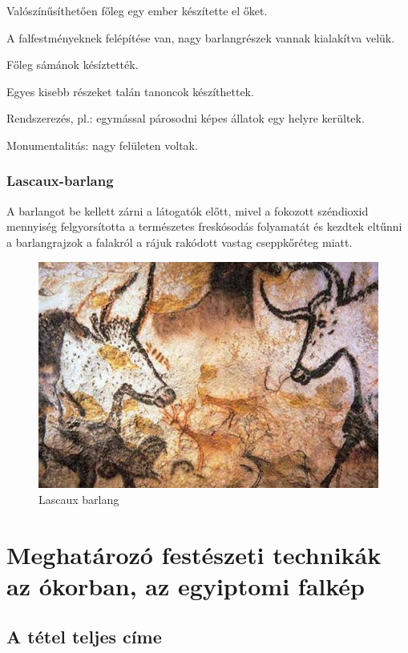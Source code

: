 		\begin{compactitem}
			\item Valószínűsíthetően főleg egy ember készítette el őket. 
			\item A falfestményeknek felépítése van, nagy barlangrészek vannak kialakítva velük.
			\item Főleg sámánok késíztették.
			\item Egyes kisebb részeket talán tanoncok készíthettek.
			\item Rendszerezés, pl.: egymással párosodni képes állatok egy helyre kerültek.
			\item Monumentalitás: nagy felületen voltak.
		\end{compactitem}
		
		\subsubsection{Lascaux-barlang}
		
		A barlangot be kellett zárni a látogatók előtt, mivel a fokozott széndioxid mennyiség felgyorsította a természetes freskósodás folyamatát és kezdtek eltűnni a barlangrajzok a falakról a rájuk rakódott vastag cseppkőréteg miatt.
		\begin{figure}[h!]
			\centering
			\includegraphics[width=0.7\linewidth]{lascaux-barlang}
			\caption{Lascaux barlang}
			\label{fig:lascaux-barlang}
		\end{figure}
		
\newpage 

\section{Meghatározó festészeti technikák az ókorban, az egyiptomi falkép}

	\subsection{A tétel teljes címe}
	
